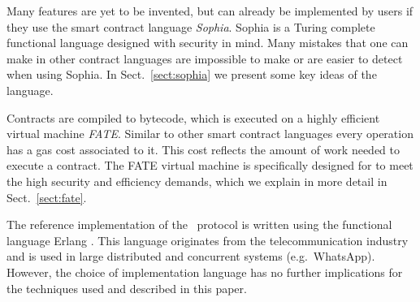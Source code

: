 Many features are yet to be invented, but can already be implemented
by users if they use the \aet smart contract language
\textit{Sophia}. Sophia is a Turing complete functional language
designed with security in mind. Many mistakes that one can make in
other contract languages are impossible to make or are easier to detect
when using Sophia. In Sect.\ \ref{sect:sophia} we present some key
ideas of the language.

Contracts are compiled to bytecode, which is executed on a highly
efficient virtual machine \textit{FATE}. Similar to other smart contract
languages every operation has a gas cost associated to it. This cost reflects
the amount of work needed to execute a contract. The FATE virtual machine is
specifically designed for
\aet to meet the high security and efficiency demands, which we
explain in more detail in Sect.~\ref{sect:fate}.

The reference implementation of the \aet\ protocol is written using the
functional language Erlang \cite{Armstrong:2010:ERL:1810891.1810910}. This
language originates from the telecommunication industry and is used in large
distributed and concurrent systems (e.g.\ WhatsApp). However, the choice
of implementation language has no further implications for the techniques used
and described in this paper.
